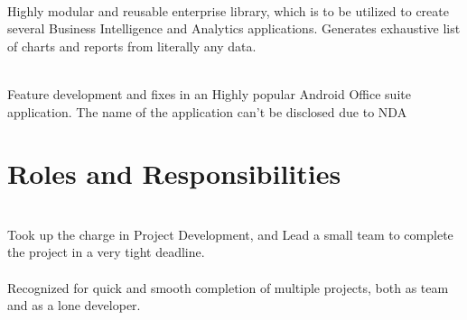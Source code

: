 \documentclass[]{deedy-resume-openfont}
\begin{document}
\hfill {}\\
Highly modular and reusable enterprise library, which is to be utilized to create several Business Intelligence and Analytics applications. Generates exhaustive list of charts and reports from literally any data.\\
\sectionsep
  

\\
Feature development and fixes in an Highly popular Android Office suite application. The name of the application can’t be disclosed due to NDA\\
\sectionsep
%
%
\section{Roles and Responsibilities}
  \\
Took up the charge in Project Development, and Lead a small team to complete the project in a very tight deadline.\\
\sectionsep
{}  \\
Recognized for quick and smooth completion of multiple projects, both as team and as a lone developer.\\
\sectionsep
\ 
\end{document}
